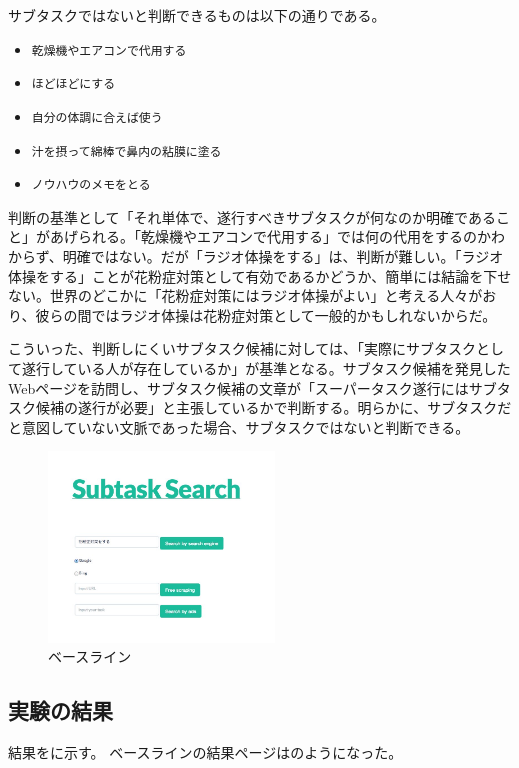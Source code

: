 \documentclass[submit,techreq]{ipsj}
\def\|{\verb|}
\begin{document}
サブタスクではないと判断できるものは以下の通りである。

\begin{itemize}
\item \|乾燥機やエアコンで代用する|
\item \|ほどほどにする|
\item \|自分の体調に合えば使う|
\item \|汁を摂って綿棒で鼻内の粘膜に塗る|
\item \|ノウハウのメモをとる|
\end{itemize}


判断の基準として「それ単体で、遂行すべきサブタスクが何なのか明確であること」があげられる。「乾燥機やエアコンで代用する」では何の代用をするのかわからず、明確ではない。だが「ラジオ体操をする」は、判断が難しい。「ラジオ体操をする」ことが花粉症対策として有効であるかどうか、簡単には結論を下せない。世界のどこかに「花粉症対策にはラジオ体操がよい」と考える人々がおり、彼らの間ではラジオ体操は花粉症対策として一般的かもしれないからだ。

こういった、判断しにくいサブタスク候補に対しては、「実際にサブタスクとして遂行している人が存在しているか」が基準となる。サブタスク候補を発見したWebページを訪問し、サブタスク候補の文章が「スーパータスク遂行にはサブタスク候補の遂行が必要」と主張しているかで判断する。明らかに、サブタスクだと意図していない文脈であった場合、サブタスクではないと判断できる。


\begin{figure}[tb]
\includegraphics[width=6cm, bb=0 0 550 719]{base_line1.jpg}
\caption{ベースライン}
\label{fig:single}
\end{figure}


\subsection{実験の結果}

結果をに示す。
ベースラインの結果ページはのようになった。
\end{document}
